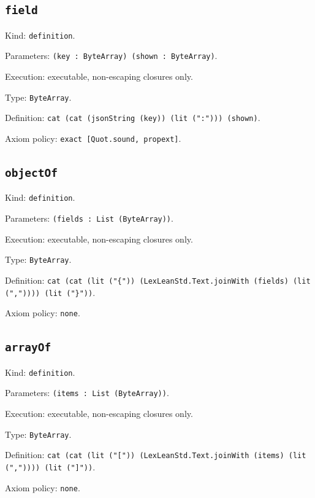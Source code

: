 \documentclass[11pt]{article}
\begin{document}
\subsection*{\texttt{field}}
\noindent Kind: \texttt{definition}.\par
\noindent Parameters: \texttt{(key : ByteArray) (shown : ByteArray)}.\par
\noindent Execution: executable, non-escaping closures only.\par
\noindent Type: \texttt{ByteArray}.\par
\noindent Definition: \texttt{cat (cat (jsonString (key)) (lit (":"))) (shown)}.\par
\noindent Axiom policy: \texttt{exact [Quot.sound, propext]}.\par
\subsection*{\texttt{objectOf}}
\noindent Kind: \texttt{definition}.\par
\noindent Parameters: \texttt{(fields : List (ByteArray))}.\par
\noindent Execution: executable, non-escaping closures only.\par
\noindent Type: \texttt{ByteArray}.\par
\noindent Definition: \texttt{cat (cat (lit ("\{")) (LexLeanStd.Text.joinWith (fields) (lit (",")))) (lit ("\}"))}.\par
\noindent Axiom policy: \texttt{none}.\par
\subsection*{\texttt{arrayOf}}
\noindent Kind: \texttt{definition}.\par
\noindent Parameters: \texttt{(items : List (ByteArray))}.\par
\noindent Execution: executable, non-escaping closures only.\par
\noindent Type: \texttt{ByteArray}.\par
\noindent Definition: \texttt{cat (cat (lit ("[")) (LexLeanStd.Text.joinWith (items) (lit (",")))) (lit ("]"))}.\par
\noindent Axiom policy: \texttt{none}.\par
\end{document}
